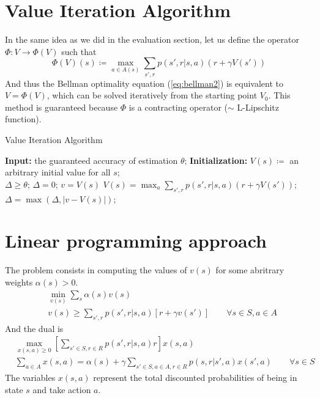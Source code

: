 \documentclass[12pt, openany]{report}
\theoremstyle{definition}
\begin{document}
\section{Value Iteration Algorithm}
In the same idea as we did in the evaluation section, let us define the operator $\Phi:V\to \Phi(V)$ such that 
\begin{equation}
	\Phi(V)(s) \coloneqq \max_{a\in A(s)} \sum_{s',r}p(s',r|s,a)(r+\gamma V(s'))
\end{equation}
And thus the Bellman optimality equation (\eqref{eq:bellman2}) is equivalent to $V=\Phi(V)$, which can be solved iteratively from the starting point $V_0$. This method is guaranteed because $\Phi$ is a contracting operator ($\sim$ L-Lipschitz function). 
\begin{algorithm}
	\caption{Value Iteration Algorithm}
	\begin{algorithmic}[1]
		\State \textbf{Input: } the guaranteed accuracy of estimation $\theta$;
		\State \textbf{Initialization: } $V(s)\coloneqq$ an arbitrary initial value for all $s$;\\ 
		\quad \qquad \qquad \qquad $\Delta \ge \theta$;
		\While {$\Delta \ge \theta$}
		\State $\Delta = 0$;
		\State $v=V(s)$
		\State $V(s) = \max_a \sum_{s',r}p(s',r|s,a)(r+\gamma V(s'))$;
		\State $\Delta = \max (\Delta, |v-V(s)|)$;
		\EndFor
		\EndWhile
	\end{algorithmic}
\end{algorithm}
\section{Linear programming approach}
The problem consists in computing the values of $v(s)$ for some abritrary weights $\alpha(s)>0$.
\begin{equation}
	\begin{aligned}
		&\min_{v(s)}\sum_s \alpha(s)v(s) \\
		& v(s)\ge \sum_{s',r}p(s',r|s,a)[r+\gamma v(s')] \qquad \forall s\in S, a\in A
	\end{aligned}
\end{equation}
And the dual is 
\begin{equation}
	\begin{aligned}
		&\max_{x(s,a)\ge 0} \left[\sum_{s'\in S, r\in R}p(s',r|s,a)r\right] x(s,a)\\
		& \sum_{a\in A} x(s,a)=\alpha(s) + \gamma \sum_{s'\in S, a\in A, r\in R} p(s,r|s',a)x(s',a) \qquad \forall s\in S
	\end{aligned}
\end{equation}
The variables $x(s,a)$ represent the total discounted probabilities of being in state $s$ and take action $a$.
\end{document}
